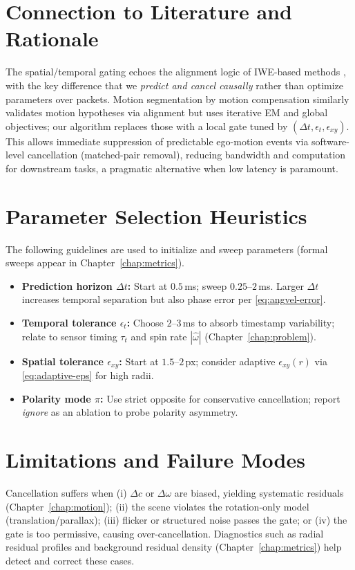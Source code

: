 \section{Connection to Literature and Rationale}
The spatial/temporal gating echoes the alignment logic of IWE-based methods \cite{Gallego2018CMax}, with the key difference that we \emph{predict and cancel causally} rather than optimize parameters over packets. Motion segmentation by motion compensation \cite{Stoffregen2019Segmentation} similarly validates motion hypotheses via alignment but uses iterative EM and global objectives; our algorithm replaces those with a local gate tuned by $(\Delta t,\epsilon_t,\epsilon_{xy})$. This allows immediate suppression of predictable ego-motion events via software-level cancellation (matched-pair removal), reducing bandwidth and computation for downstream tasks, a pragmatic alternative when low latency is paramount.

\section{Parameter Selection Heuristics}
The following guidelines are used to initialize and sweep parameters (formal sweeps appear in Chapter~\ref{chap:metrics}).
\begin{itemize}
    \item \textbf{Prediction horizon $\Delta t$:} Start at $0.5$\,ms; sweep $0.25$–$2$\,ms. Larger $\Delta t$ increases temporal separation but also phase error per \eqref{eq:angvel-error}.
    \item \textbf{Temporal tolerance $\epsilon_t$:} Choose $2$–$3$\,ms to absorb timestamp variability; relate to sensor timing $\tau_t$ and spin rate $|\hat\omega|$ (Chapter~\ref{chap:problem}).
    \item \textbf{Spatial tolerance $\epsilon_{xy}$:} Start at $1.5$–$2$\,px; consider adaptive $\epsilon_{xy}(r)$ via \eqref{eq:adaptive-eps} for high radii.
    \item \textbf{Polarity mode $\pi$:} Use strict opposite for conservative cancellation; report \emph{ignore} as an ablation to probe polarity asymmetry.
\end{itemize}

\section{Limitations and Failure Modes}
Cancellation suffers when (i) $\Delta c$ or $\Delta\omega$ are biased, yielding systematic residuals (Chapter~\ref{chap:motion}); (ii) the scene violates the rotation-only model (translation/parallax); (iii) flicker or structured noise passes the gate; or (iv) the gate is too permissive, causing over-cancellation. Diagnostics such as radial residual profiles and background residual density (Chapter~\ref{chap:metrics}) help detect and correct these cases.

